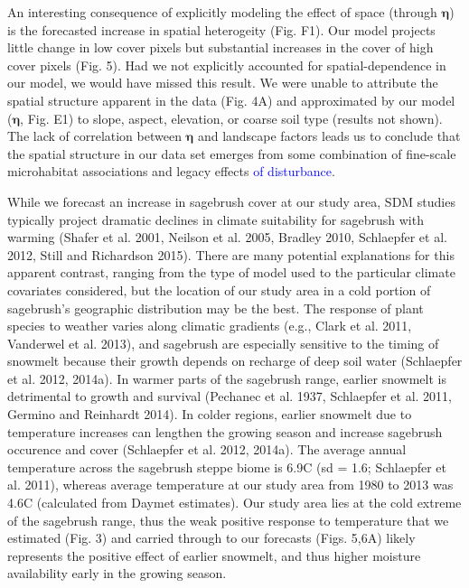 \documentclass[12pt,]{article}
\begin{document}
An interesting consequence of explicitly modeling the effect of space
(through \(\boldsymbol{\eta}\)) is the forecasted increase in spatial
heterogeity (Fig. F1). Our model projects little change in low cover
pixels but substantial increases in the cover of high cover pixels (Fig.
5). Had we not explicitly accounted for spatial-dependence in our model,
we would have missed this result. We were unable to attribute the
spatial structure apparent in the data (Fig. 4A) and approximated by our
model (\(\boldsymbol{\eta}\), Fig. E1) to slope, aspect, elevation, or
coarse soil type (results not shown). The lack of correlation between
\(\boldsymbol{\eta}\) and landscape factors leads us to conclude that
the spatial structure in our data set emerges from some combination of
fine-scale microhabitat associations and legacy effects
\textcolor{blue}{of disturbance}.

While we forecast an increase in sagebrush cover at our study area, SDM
studies typically project dramatic declines in climate suitability for
sagebrush with warming (Shafer et al. 2001, Neilson et al. 2005, Bradley
2010, Schlaepfer et al. 2012, Still and Richardson 2015). There are many
potential explanations for this apparent contrast, ranging from the type
of model used to the particular climate covariates considered, but the
location of our study area in a cold portion of sagebrush's geographic
distribution may be the best. The response of plant species to weather
varies along climatic gradients (e.g., Clark et al. 2011, Vanderwel et
al. 2013), and sagebrush are especially sensitive to the timing of
snowmelt because their growth depends on recharge of deep soil water
(Schlaepfer et al. 2012, 2014a). In warmer parts of the sagebrush range,
earlier snowmelt is detrimental to growth and survival (Pechanec et al.
1937, Schlaepfer et al. 2011, Germino and Reinhardt 2014). In colder
regions, earlier snowmelt due to temperature increases can lengthen the
growing season and increase sagebrush occurence and cover (Schlaepfer et
al. 2012, 2014a). The average annual temperature across the sagebrush
steppe biome is 6.9\textdegree C (sd = 1.6; Schlaepfer et al. 2011),
whereas average temperature at our study area from 1980 to 2013 was
4.6\textdegree C (calculated from Daymet estimates). Our study area lies
at the cold extreme of the sagebrush range, thus the weak positive
response to temperature that we estimated (Fig. 3) and carried through
to our forecasts (Figs. 5,6A) likely represents the positive effect of
earlier snowmelt, and thus higher moisture availability early in the
growing season.
\end{document}
